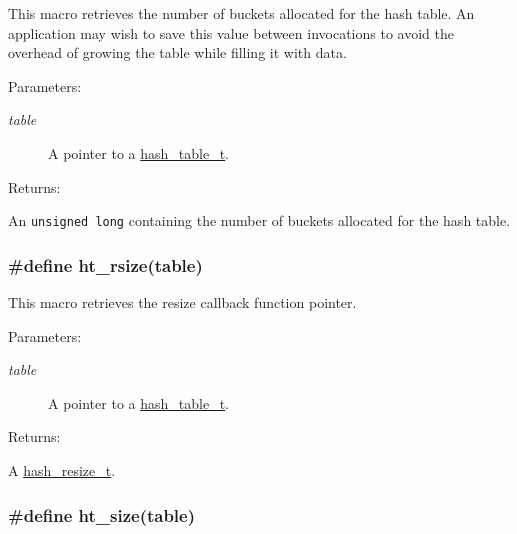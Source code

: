 This macro retrieves the number of buckets allocated for the hash table. An application may wish to save this value between invocations to avoid the overhead of growing the table while filling it with data.\begin{Desc}
\item[Parameters: ]\par
\begin{description}
\item[{\em 
table}]A pointer to a \hyperlink{group__dbprim__hash_a0}{hash\_\-table\_\-t}.\end{description}
\end{Desc}
\begin{Desc}
\item[Returns: ]\par
An {\tt unsigned long} containing the number of buckets allocated for the hash table. \end{Desc}
\hypertarget{group__dbprim__hash_a26}{
\subsubsection[ht\_\-rsize]{\setlength{\rightskip}{0pt plus 5cm}\#define ht\_\-rsize(table)}}
\label{group__dbprim__hash_a26}


This macro retrieves the resize callback function pointer.\begin{Desc}
\item[Parameters: ]\par
\begin{description}
\item[{\em 
table}]A pointer to a \hyperlink{group__dbprim__hash_a0}{hash\_\-table\_\-t}.\end{description}
\end{Desc}
\begin{Desc}
\item[Returns: ]\par
A \hyperlink{group__dbprim__hash_a5}{hash\_\-resize\_\-t}. \end{Desc}
\hypertarget{group__dbprim__hash_a28}{
\subsubsection[ht\_\-size]{\setlength{\rightskip}{0pt plus 5cm}\#define ht\_\-size(table)}}
\label{group__dbprim__hash_a28}


